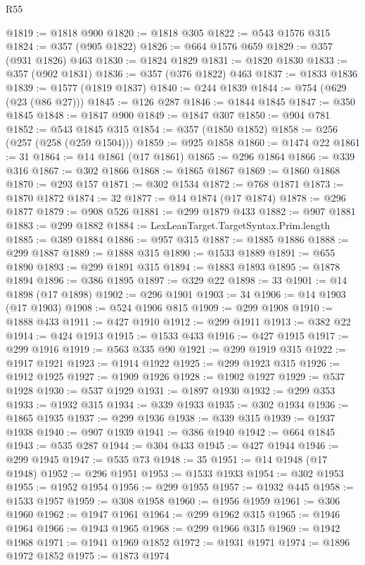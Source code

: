 \begin{lexlean}{R55}
\begin{coremodule}
@1819 := @1818 @900
@1820 := @1818 @305
@1822 := @543 @1576 @315
@1824 := @357 (@905 @1822)
@1826 := @664 @1576 @659
@1829 := @357 (@931 @1826) @463
@1830 := @1824 @1829
@1831 := @1820 @1830
@1833 := @357 (@902 @1831)
@1836 := @357 (@376 @1822) @463
@1837 := @1833 @1836
@1839 := @1577 (@1819 @1837)
@1840 := @244 @1839
@1844 := @754 (@629 (@23 (@86 @27)))
@1845 := @126 @287
@1846 := @1844 @1845
@1847 := @350 @1845
@1848 := @1847 @900
@1849 := @1847 @307
@1850 := @904 @781
@1852 := @543 @1845 @315
@1854 := @357 (@1850 @1852)
@1858 := @256 (@257 (@258 (@259 @1504)))
@1859 := @925 @1858
@1860 := @1474 @22
@1861 := 31
@1864 := @14 @1861 (@17 @1861)
@1865 := @296 @1864
@1866 := @339 @316
@1867 := @302 @1866
@1868 := @1865 @1867
@1869 := @1860 @1868
@1870 := @293 @157
@1871 := @302 @1534
@1872 := @768 @1871
@1873 := @1870 @1872
@1874 := 32
@1877 := @14 @1874 (@17 @1874)
@1878 := @296 @1877
@1879 := @908 @526
@1881 := @299 @1879 @433
@1882 := @907 @1881
@1883 := @299 @1882
@1884 := LexLeanTarget.TargetSyntax.Prim.length
@1885 := @389 @1884
@1886 := @957 @315
@1887 := @1885 @1886
@1888 := @299 @1887
@1889 := @1888 @315
@1890 := @1533 @1889
@1891 := @655 @1890
@1893 := @299 @1891 @315
@1894 := @1883 @1893
@1895 := @1878 @1894
@1896 := @386 @1895
@1897 := @329 @22
@1898 := 33
@1901 := @14 @1898 (@17 @1898)
@1902 := @296 @1901
@1903 := 34
@1906 := @14 @1903 (@17 @1903)
@1908 := @524 @1906 @815
@1909 := @299 @1908
@1910 := @1888 @433
@1911 := @427 @1910
@1912 := @299 @1911
@1913 := @382 @22
@1914 := @424 @1913
@1915 := @1533 @433
@1916 := @427 @1915
@1917 := @299 @1916
@1919 := @563 @335 @90
@1921 := @299 @1919 @315
@1922 := @1917 @1921
@1923 := @1914 @1922
@1925 := @299 @1923 @315
@1926 := @1912 @1925
@1927 := @1909 @1926
@1928 := @1902 @1927
@1929 := @537 @1928
@1930 := @537 @1929
@1931 := @1897 @1930
@1932 := @299 @353
@1933 := @1932 @315
@1934 := @339 @1933
@1935 := @302 @1934
@1936 := @1865 @1935
@1937 := @299 @1936
@1938 := @339 @315
@1939 := @1937 @1938
@1940 := @907 @1939
@1941 := @386 @1940
@1942 := @664 @1845
@1943 := @535 @287
@1944 := @304 @433
@1945 := @427 @1944
@1946 := @299 @1945
@1947 := @535 @73
@1948 := 35
@1951 := @14 @1948 (@17 @1948)
@1952 := @296 @1951
@1953 := @1533 @1933
@1954 := @302 @1953
@1955 := @1952 @1954
@1956 := @299 @1955
@1957 := @1932 @445
@1958 := @1533 @1957
@1959 := @308 @1958
@1960 := @1956 @1959
@1961 := @306 @1960
@1962 := @1947 @1961
@1964 := @299 @1962 @315
@1965 := @1946 @1964
@1966 := @1943 @1965
@1968 := @299 @1966 @315
@1969 := @1942 @1968
@1971 := @1941 @1969 @1852
@1972 := @1931 @1971
@1974 := @1896 @1972 @1852
@1975 := @1873 @1974

\end{coremodule}
\end{lexlean}
